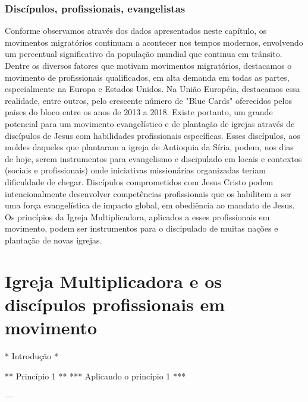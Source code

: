 \documentclass[
	12pt,				%
	openright,			%
	twoside,			%
	a4paper,			%
	english,			%
	french,				%
	spanish,			%
	brazil				%
	]{abntex2}
\begin{document}
\subsection{Discípulos, profissionais, evangelistas}

Conforme observamos através dos dados apresentados neste capítulo, os movimentos migratórios continuam a acontecer nos tempos modernos, envolvendo um percentual significativo da população mundial que continua em trânsito. Dentre os diversos fatores que motivam movimentos migratórios, destacamos o movimento de profissionais qualificados, em alta demanda em todas as partes, especialmente na Europa e Estados Unidos. Na União Européia, destacamos essa realidade, entre outros, pelo crescente número de "Blue Cards" oferecidos pelos paises do bloco entre os anos de 2013 a 2018. Existe portanto, um grande potencial para um movimento evangelístico e de plantação de igrejas através de discípulos de Jesus com habilidades profissionais específicas. Esses discípulos, aos moldes daqueles que plantaram a igreja de Antioquia da Síria, podem, nos dias de hoje, serem instrumentos para evangelismo e discipulado em locais e contextos (sociais e profissionais) onde iniciativas missionárias organizadas teriam dificuldade de chegar. Discípulos comprometidos com Jesus Cristo podem intencionalmente desenvolver competências profissionais que os habilitem a ser uma força evangelística de impacto global, em obediência ao mandato de Jesus. Os princípios da Igreja Multiplicadora, aplicados a esses profissionais em movimento, podem ser instrumentos para o discipulado de muitas nações e plantação de novas igrejas.

\chapter{Igreja Multiplicadora e os discípulos profissionais em movimento}

* Introdução *



** Princípio 1 ** 
*** Aplicando o princípio 1 ***

---





\end{document}
